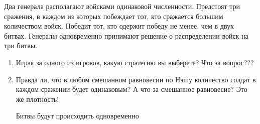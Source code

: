 \begin{problem}
Два генерала располагают войсками одинаковой численности. Предстоят три сражения, в каждом из которых побеждает тот, кто сражается большим количеством войск. Победит тот, кто одержит победу не менее, чем в двух битвах. Генералы одновременно принимают решение о распределении войск на три битвы.
\begin{enumerate}

\item
Играя за одного из игроков, какую стратегию вы выберете? {\red Что за вопрос???}

\item Правда ли, что в любом смешанном равновесии по Нэшу количество солдат в каждом сражении будет одинаковым?  {\red А что за смешанное равновесие? Это же плотность!}

{\red Битвы будут происходить одновременно}
\end{enumerate}


\begin{sol}

\end{sol}
\end{problem}










